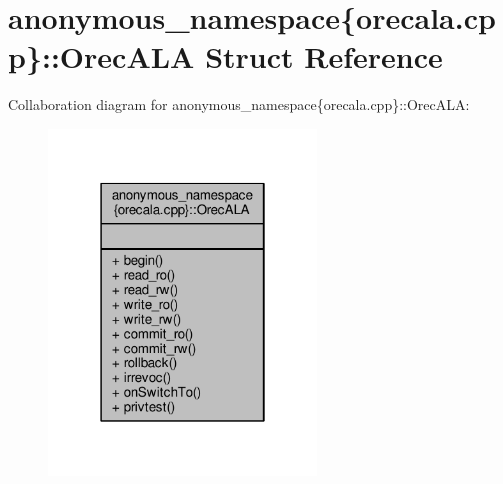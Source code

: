 \hypertarget{structanonymous__namespace_02orecala_8cpp_03_1_1OrecALA}{\section{anonymous\-\_\-namespace\{orecala.\-cpp\}\-:\-:Orec\-A\-L\-A Struct Reference}
\label{structanonymous__namespace_02orecala_8cpp_03_1_1OrecALA}
}


Collaboration diagram for anonymous\-\_\-namespace\{orecala.\-cpp\}\-:\-:Orec\-A\-L\-A\-:
\nopagebreak
\begin{figure}[H]
\begin{center}
\leavevmode
\includegraphics[width=202pt]{structanonymous__namespace_02orecala_8cpp_03_1_1OrecALA__coll__graph}
\end{center}
\end{figure}
